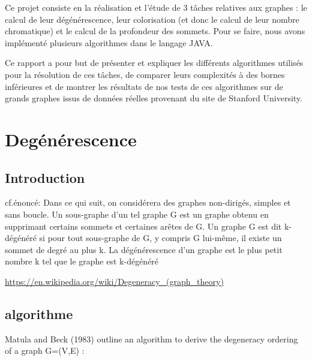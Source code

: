 Ce projet consiste en la réalisation et l'étude de 3 tâches relatives aux graphes : le calcul de leur dégénérescence, leur colorisation (et donc le calcul de leur nombre chromatique) et le calcul de la profondeur des sommets. Pour se faire, nous avons implémenté plusieurs algorithmes dans le langage JAVA.

Ce rapport a pour but de présenter et expliquer les différents algorithmes utilisés pour la résolution de ces tâches, de comparer leurs complexités à des bornes inférieures et de montrer les résultats de nos tests de ces algorithmes sur de grands graphes issus de données réelles provenant du site de Stanford University.









\newpage
\section{Degénérescence}

\subsection{Introduction}
cf.énoncé:
Dans ce qui suit, on considérera des graphes non-dirigés, simples et sans boucle. Un sous-graphe d’un tel graphe G est un graphe obtenu en supprimant certains sommets et certaines arêtes de G. Un graphe G est dit k-dégénéré si pour tout sous-graphe de G, y compris G lui-même, il existe un sommet de degré au plus k. La dégénérescence d’un graphe est le plus petit nombre k tel que le graphe est k-dégénéré


\href{https://en.wikipedia.org/wiki/Degeneracy_(graph_theory)}{https://en.wikipedia.org/wiki/Degeneracy_(graph_theory)}

\subsection{algorithme}
\label{sec:Degenerescence_algorithme}

Matula and Beck (1983) outline an algorithm to derive the degeneracy ordering of a graph
{\displaystyle G=(V,E)} :


